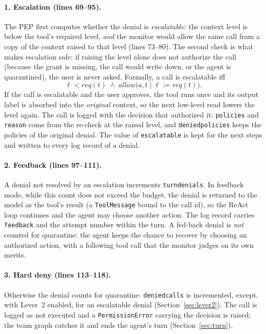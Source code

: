 \documentclass[11pt,a4paper]{article}
\DeclareRobustCommand{\code}[1]{{\renewcommand{\_}{\textunderscore\allowbreak}\texttt{#1}}}
\begin{document}
\paragraph{1. Escalation (lines 69--95).} The PEP first computes whether the denial is
\emph{escalatable}: the context level is below the tool's required level, \emph{and} the
monitor would allow the same call from a copy of the context raised to that level
(lines 73--80). The second check is what makes escalation safe: if raising the level
alone does not authorize the call (because the grant is missing, the call would write
down, or the agent is quarantined), the user is never asked. Formally, a call is
escalatable iff
\begin{equation}
  \ell < \mathit{req}(t) \;\wedge\; \mathit{allow}\bigl(a, t \mid \ell := \mathit{req}(t)\bigr).
  \label{eq:escalatable}
\end{equation}
If the call is escalatable and the user approves, the tool runs once and its output label
is absorbed into the \emph{original} context, so the next low-level read lowers the level
again. The call is logged with the decision that authorized it: \code{policies} and
\code{reason} come from the re-check at the raised level, and \code{denied\_policies}
keeps the policies of the original denial. The value of \code{escalatable} is kept for
the next steps and written to every log record of a denial.

\paragraph{2. Feedback (lines 97--111).} A denial not resolved by an escalation
increments \code{\_turn\_denials}. In feedback mode, while this count does not exceed the
budget, the denial is returned to the model as the tool's result (a \code{ToolMessage}
bound to the call id), so the ReAct loop continues and the agent may choose another
action. The log record carries \code{feedback} and the attempt number within the turn. A
fed-back denial is \emph{not} counted for quarantine: the agent keeps the chance to
recover by choosing an authorized action, with a following tool call that the monitor
judges on its own merits.

\paragraph{3. Hard deny (lines 113--118).} Otherwise the denial counts for quarantine:
\code{denied\_calls} is incremented, except, with Lever~2 enabled, for an escalatable
denial (Section~\ref{sec:lever2}). The call is logged as not executed and a
\code{PermissionError} carrying the decision is raised; the team graph catches it and ends
the agent's turn (Section~\ref{sec:turn}).
\end{document}
